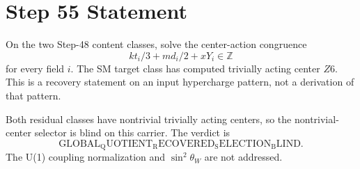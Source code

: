 \documentclass[11pt]{article}
\begin{document}
\section*{Step 55 Statement}
On the two Step-48 content classes, solve the center-action congruence
\[
  k t_i/3 + m d_i/2 + x Y_i \in \mathbb{Z}
\]
for every field \(i\). The SM target class has computed trivially acting center
\(Z6\). This is a recovery statement on an input hypercharge pattern, not a derivation of that pattern.

Both residual classes have nontrivial trivially acting centers, so the nontrivial-center selector is blind on this carrier. The verdict is
\[
  \mathrm{GLOBAL_QUOTIENT_RECOVERED_SELECTION_BLIND}.
\]
The U(1) coupling normalization and \(\sin^2\theta_W\) are not addressed.
\end{document}
